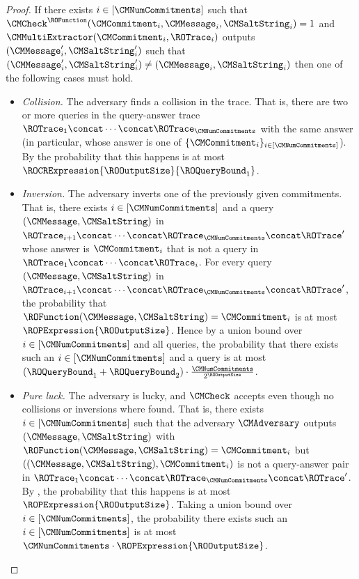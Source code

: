 \begin{proof}
If there exists $i \in [\CMNumCommitments]$ such that $\CMCheck^{\ROFunction}(\CMCommitment_{i},\CMMessage_{i},\CMSaltString_{i})=1$ and $\CMMultiExtractor(\CMCommitment_{i},\ROTrace_{i})$ outputs $(\CMMessage_{i}',\CMSaltString_{i}')$ such that $(\CMMessage_{i}',\CMSaltString_{i}') \neq (\CMMessage_{i},\CMSaltString_{i})$ then one of the following cases must hold.
\begin{itemize}

  \item \emph{Collision.} The adversary finds a collision in the trace. That is, there are two or more queries in the query-answer trace $\ROTrace_{1} \concat \cdots \concat \ROTrace_{\CMNumCommitments}$ with the same answer (in particular, whose answer is one of $\{ \CMCommitment_{i} \}_{i \in [\CMNumCommitments]}$). By  the probability that this happens is at most $\ROCRExpression{\ROOutputSize}{\ROQueryBound_{1}}$.

  \item \emph{Inversion.} The adversary inverts one of the previously given commitments. That is, there exists $i \in [\CMNumCommitments]$ and a query $(\CMMessage,\CMSaltString)$ in $\ROTrace_{i+1} \concat \cdots \concat \ROTrace_{\CMNumCommitments} \concat \ROTrace'$ whose answer is $\CMCommitment_{i}$ that is not a query in $\ROTrace_{1} \concat \cdots \concat \ROTrace_{i}$. For every query $(\CMMessage,\CMSaltString)$ in $\ROTrace_{i+1} \concat \cdots \concat \ROTrace_{\CMNumCommitments} \concat \ROTrace'$, the probability that $\ROFunction(\CMMessage,\CMSaltString)  = \CMCommitment_{i}$ is at most $\ROPExpression{\ROOutputSize}$. Hence by a union bound over $i \in [\CMNumCommitments]$ and all queries, the probability that there exists such an $i \in [\CMNumCommitments]$ and a query is at most $(\ROQueryBound_{1}+\ROQueryBound_{2}) \cdot \frac{\CMNumCommitments}{2^{\ROOutputSize}}$.

  \item \emph{Pure luck.} The adversary is lucky, and $\CMCheck$ accepts even though no collisions or inversions where found. That is, there exists $i \in [\CMNumCommitments]$ such that the adversary $\CMAdversary$ outputs $(\CMMessage,\CMSaltString)$ with $\ROFunction(\CMMessage,\CMSaltString) = \CMCommitment_{i}$ but $((\CMMessage,\CMSaltString),\CMCommitment_{i})$ is not a query-answer pair in $\ROTrace_{1} \concat \cdots \concat \ROTrace_{\CMNumCommitments} \concat \ROTrace'$. By , the probability that this happens is at most $\ROPExpression{\ROOutputSize}$. Taking a union bound over $i \in [\CMNumCommitments]$, the probability there exists such an $i \in [\CMNumCommitments]$ is at most $\CMNumCommitments \cdot \ROPExpression{\ROOutputSize}$.


\end{itemize}
\end{proof}
